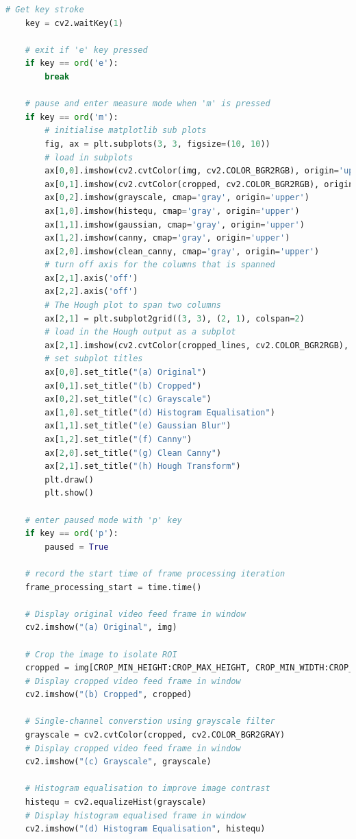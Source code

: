 \documentclass[10pt,conference]{IEEEtran}
\begin{document}
\begin{lstlisting}[language=Python,basicstyle=\tiny, showspaces=false, showstringspaces=false tabsize=1, breaklines=true]
    # Get key stroke
    key = cv2.waitKey(1)

    # exit if 'e' key pressed
    if key == ord('e'):
        break

    # pause and enter measure mode when 'm' is pressed
    if key == ord('m'):
        # initialise matplotlib sub plots
        fig, ax = plt.subplots(3, 3, figsize=(10, 10))
        # load in subplots
        ax[0,0].imshow(cv2.cvtColor(img, cv2.COLOR_BGR2RGB), origin='upper')
        ax[0,1].imshow(cv2.cvtColor(cropped, cv2.COLOR_BGR2RGB), origin='upper')
        ax[0,2].imshow(grayscale, cmap='gray', origin='upper')
        ax[1,0].imshow(histequ, cmap='gray', origin='upper')
        ax[1,1].imshow(gaussian, cmap='gray', origin='upper')
        ax[1,2].imshow(canny, cmap='gray', origin='upper')
        ax[2,0].imshow(clean_canny, cmap='gray', origin='upper')
        # turn off axis for the columns that is spanned
        ax[2,1].axis('off')
        ax[2,2].axis('off')
        # The Hough plot to span two columns
        ax[2,1] = plt.subplot2grid((3, 3), (2, 1), colspan=2)
        # load in the Hough output as a subplot
        ax[2,1].imshow(cv2.cvtColor(cropped_lines, cv2.COLOR_BGR2RGB), origin='upper')
        # set subplot titles
        ax[0,0].set_title("(a) Original")
        ax[0,1].set_title("(b) Cropped")
        ax[0,2].set_title("(c) Grayscale")
        ax[1,0].set_title("(d) Histogram Equalisation")
        ax[1,1].set_title("(e) Gaussian Blur")
        ax[1,2].set_title("(f) Canny")
        ax[2,0].set_title("(g) Clean Canny")
        ax[2,1].set_title("(h) Hough Transform")
        plt.draw()
        plt.show()

    # enter paused mode with 'p' key
    if key == ord('p'):
        paused = True

    # record the start time of frame processing iteration
    frame_processing_start = time.time()

    # Display original video feed frame in window
    cv2.imshow("(a) Original", img)
    
    # Crop the image to isolate ROI
    cropped = img[CROP_MIN_HEIGHT:CROP_MAX_HEIGHT, CROP_MIN_WIDTH:CROP_MAX_WIDTH]
    # Display cropped video feed frame in window
    cv2.imshow("(b) Cropped", cropped)
    
    # Single-channel converstion using grayscale filter
    grayscale = cv2.cvtColor(cropped, cv2.COLOR_BGR2GRAY)
    # Display cropped video feed frame in window
    cv2.imshow("(c) Grayscale", grayscale)
    
    # Histogram equalisation to improve image contrast
    histequ = cv2.equalizeHist(grayscale)
    # Display histogram equalised frame in window
    cv2.imshow("(d) Histogram Equalisation", histequ)
    

\end{lstlisting}
\end{document}

